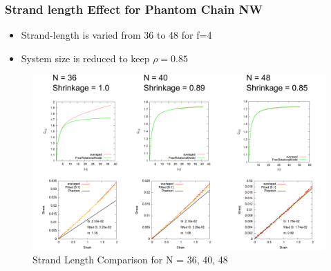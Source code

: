 \documentclass[12pt, dvipdfmx]{beamer}
\begin{document}
\begin{frame}
	\frametitle{
		Strand length Effect for Phantom Chain NW
	}
	\begin{itemize}
		\item Strand-length is varied \alert{from 36 to 48 for f=4}
		\item System size is reduced to keep $\rho = 0.85$
	\end{itemize}

	\begin{figure}[htb]
		\centering
			\includegraphics[width=.8\textwidth]{N36_N40_N48.png}
			\caption{Strand Length Comparison for N = 36, 40, 48}
			\label{4_N364048}
	\end{figure}

\end{frame}
\end{document}
